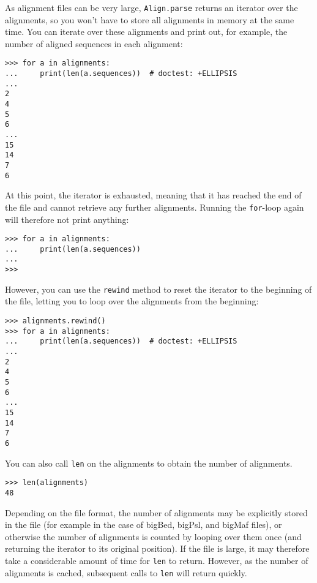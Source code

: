 As alignment files can be very large, \verb|Align.parse| returns an iterator over the alignments, so you won't have to store all alignments in memory at the same time. You can iterate over these alignments and print out, for example, the number of aligned sequences in each alignment:
\begin{verbatim}
>>> for a in alignments:
...     print(len(a.sequences))  # doctest: +ELLIPSIS
...
2
4
5
6
...
15
14
7
6
\end{verbatim}
At this point, the iterator is exhausted, meaning that it has reached the end of the file and cannot retrieve any further alignments. Running the \verb|for|-loop again will therefore not print anything:
\begin{verbatim}
>>> for a in alignments:
...     print(len(a.sequences))
...
>>>
\end{verbatim}
However, you can use the \verb|rewind| method to reset the iterator to the beginning of the file, letting you to loop over the alignments from the beginning:
\begin{verbatim}
>>> alignments.rewind()
>>> for a in alignments:
...     print(len(a.sequences))  # doctest: +ELLIPSIS
...
2
4
5
6
...
15
14
7
6
\end{verbatim}
You can also call \verb|len| on the alignments to obtain the number of alignments.
\begin{verbatim}
>>> len(alignments)
48
\end{verbatim}
Depending on the file format, the number of alignments may be explicitly stored in the file (for example in the case of bigBed, bigPsl, and bigMaf files), or otherwise the number of alignments is counted by looping over them once (and returning the iterator to its original position).  If the file is large, it may therefore take a considerable amount of time for \verb|len| to return. However, as the number of alignments is cached, subsequent calls to \verb|len| will return quickly.


